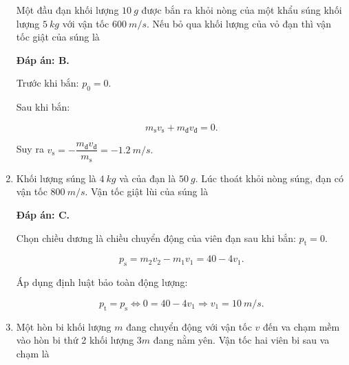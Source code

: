 \begin{enumerate}[label=\bfseries Câu \arabic*:]
	
	{Một đầu đạn khối lượng $\SI{10}{g}$ được bắn ra khỏi nòng của một khẩu súng khối lượng $\SI{5}{kg}$ với vận tốc $\SI{600}{m/s}$. Nếu bỏ qua khối lượng của vỏ đạn thì vận tốc giật của súng là
	}
	
	\hideall
	{
	\textbf{Đáp án: B.}
			
	Trước khi bắn: $p_0 = 0$.
	
	Sau khi bắn:
	
	$$m_\text{s}v_\text{s} + m_\text{đ}v_\text{đ} = 0.$$
	
	Suy ra $v_\text{s} = - \dfrac{m_\text{đ}v_\text{đ}}{m_\text{s}} = -\SI{1,2}{m/s}.$
	
	}
	\item {}
	
	
	{Khối lượng súng là $\SI{4}{kg}$ và của đạn là $\SI{50}{g}$. Lúc thoát khỏi nòng súng, đạn có vận tốc $\SI{800}{m/s}$. Vận tốc giật lùi của súng là
	}
	
	\hideall
	{	\textbf{Đáp án: C.}
		
		Chọn chiều dương là chiều chuyển động của viên đạn sau khi bắn: $p_\text{t} = 0.$
		
		$$p_\text{s} = m_2v_2 - m_1v_1 = 40 - 4v_1.$$
		
		Áp dụng định luật bảo toàn động lượng:
		
		$$p_\text{t} = p_\text{s} \Leftrightarrow 0 = 40 - 4v_1 \Rightarrow v_1 = \SI{10}{m/s}.$$ 
	}
	\item {}
	
	
	{Một hòn bi khối lượng $m$ đang chuyển động với vận tốc $v$ đến va chạm mềm vào hòn bi thứ 2 khối lượng $3m$ đang nằm yên. Vận tốc hai viên bi sau va chạm là
	}
	

\end{enumerate}
